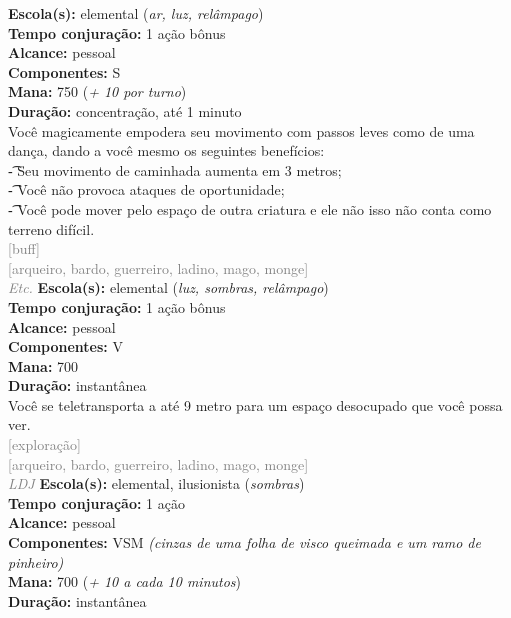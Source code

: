 \documentclass{RPG_Adventure}[2021/10/20]
\begin{document}
{\small \t \textbf{Escola(s):} elemental (\textit{ar, luz, relâmpago})\\\t \textbf{Tempo conjuração:} 1 ação bônus\\\t \textbf{Alcance:} pessoal\\\t \textbf{Componentes:} S\\\t \textbf{Mana:} 750 (\textit{+ 10 por turno})\\\t \textbf{Duração:} concentração, até 1 minuto\\}
{\normalsize Você magicamente empodera seu movimento com passos leves como de uma dança, dando a você mesmo os seguintes benefícios:\\\t - Seu movimento de caminhada aumenta em 3 metros;\\\t - Você não provoca ataques de oportunidade;\\\t - Você pode mover pelo espaço de outra criatura e ele não isso não conta como terreno difícil.\\}
{\scriptsize \textcolor{gray}{[buff]\\}}
{\scriptsize \textcolor{gray}{[arqueiro, bardo, guerreiro, ladino, mago, monge]\\}}
{\tiny \textcolor{gray}{\textit{Etc.}}}\jump{}
{\small \t \textbf{Escola(s):} elemental (\textit{luz, sombras, relâmpago})\\\t \textbf{Tempo conjuração:} 1 ação bônus\\\t \textbf{Alcance:} pessoal\\\t \textbf{Componentes:} V\\\t \textbf{Mana:} 700\\\t \textbf{Duração:} instantânea\\}
{\normalsize Você se teletransporta a até 9 metro para um espaço desocupado que você possa ver.\\}
{\scriptsize \textcolor{gray}{[exploração]\\}}
{\scriptsize \textcolor{gray}{[arqueiro, bardo, guerreiro, ladino, mago, monge]\\}}
{\tiny \textcolor{gray}{\textit{LDJ}}}\jump{}
{\small \t \textbf{Escola(s):} elemental, ilusionista (\textit{sombras})\\\t \textbf{Tempo conjuração:} 1 ação\\\t \textbf{Alcance:} pessoal\\\t \textbf{Componentes:} VSM \textit{(cinzas de uma folha de visco queimada e um ramo de pinheiro)}\\\t \textbf{Mana:} 700 (\textit{+ 10 a cada 10 minutos})\\\t \textbf{Duração:} instantânea\\}
\end{document}
